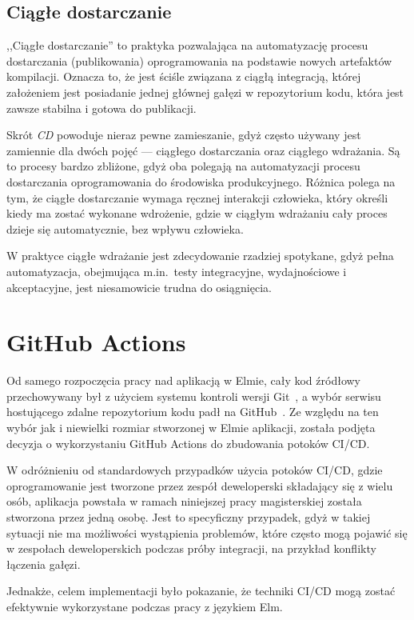 \documentclass[twoside,a4paper]{report}
\begin{document}
\subsection{Ciągłe dostarczanie}
,,Ciągłe dostarczanie'' to praktyka pozwalająca na automatyzację procesu dostarczania (publikowania) oprogramowania na podstawie nowych artefaktów kompilacji.
Oznacza to, że jest ściśle związana z ciągłą integracją, której założeniem jest posiadanie jednej głównej gałęzi w repozytorium kodu, która jest zawsze stabilna i gotowa do publikacji.

Skrót \textit{CD} powoduje nieraz pewne zamieszanie, gdyż często używany jest zamiennie dla dwóch pojęć --- ciągłego dostarczania oraz ciągłego wdrażania.
Są to procesy bardzo zbliżone, gdyż oba polegają na automatyzacji procesu dostarczania oprogramowania do środowiska produkcyjnego.
Różnica polega na tym, że ciągłe dostarczanie wymaga ręcznej interakcji człowieka, który określi kiedy ma zostać wykonane wdrożenie, gdzie w ciągłym wdrażaniu cały proces dzieje się automatycznie, bez wpływu człowieka.

W praktyce ciągłe wdrażanie jest zdecydowanie rzadziej spotykane, gdyż pełna automatyzacja, obejmująca m.in.~testy integracyjne, wydajnościowe i akceptacyjne, jest niesamowicie trudna do osiągnięcia.

\section{GitHub Actions}
Od samego rozpoczęcia pracy nad aplikacją w Elmie, cały kod źródłowy przechowywany był z użyciem systemu kontroli wersji Git~\cite{git}, a wybór serwisu hostującego zdalne repozytorium kodu padł na GitHub~\cite{github}.
Ze względu na ten wybór jak i niewielki rozmiar stworzonej w Elmie aplikacji, została podjęta decyzja o wykorzystaniu GitHub Actions do zbudowania potoków CI/CD\@.

W odróżnieniu od standardowych przypadków użycia potoków CI/CD, gdzie oprogramowanie jest tworzone przez zespół deweloperski składający się z wielu osób, aplikacja powstała w ramach niniejszej pracy magisterskiej została stworzona przez jedną osobę.
Jest to specyficzny przypadek, gdyż w takiej sytuacji nie ma możliwości wystąpienia problemów, które często mogą pojawić się w zespołach deweloperskich podczas próby integracji, na przykład konflikty łączenia gałęzi.

Jednakże, celem implementacji było pokazanie, że techniki CI/CD mogą zostać efektywnie wykorzystane podczas pracy z językiem Elm.
\end{document}

